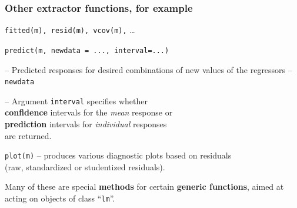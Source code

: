 \documentclass[12pt,dvipsnames,t,handout%
,aspectratio=169%
]{beamer}
\begin{document}
\begin{frame}[fragile]\frametitle{Other extractor functions, for example}

\bi
\item \texttt{fitted(m), resid(m), vcov(m),} \dots 
\medskip
\item \texttt{predict(m, newdata = ..., interval=...)} 
\bi
{\normalsize
\item[--] Predicted responses for desired combinations 
of new values of the regressors -- {\tt newdata}
\medskip
\item[--] Argument {\tt interval} specifies whether \\
{\bf confidence} intervals for the {\it mean} response or \\ {\bf prediction} intervals
for {\it individual} responses \\ are returned.
}
\ei
\item \texttt{plot(m)} -- produces various diagnostic plots based
on residuals \\ (raw, standardized or studentized residuals).
\ei

Many of these are special {\bf methods} for certain {\bf generic functions},  
aimed at acting on objects of class ``{\tt lm}''.  

 
\vfill
\end{frame}
\end{document}
